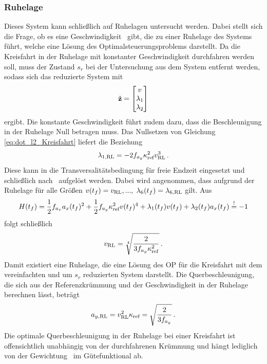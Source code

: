 \subsubsection{Ruhelage}\label{subsubsec:RL_ohne_Querdynamik}
Dieses System kann schließlich auf Ruhelagen untersucht werden. Dabei stellt sich die Frage, ob es eine Geschwindigkeit \vRL~gibt, die zu einer Ruhelage des Systems führt, welche eine Lösung des Optimalsteuerungsproblems darstellt. Da die Kreisfahrt in der Ruhelage mit konstanter Geschwindigkeit durchfahren werden soll, muss der Zustand $s_r$ bei der Untersuchung aus dem System entfernt werden, sodass sich das reduzierte System mit 
\begin{equation}
\tilde{\boldsymbol{\mathrm{z}}} = \begin{bmatrix}
v \\
\lambda_1 \\
\lambda_2
\end{bmatrix}
\end{equation}
ergibt. Die konstante Geschwindigkeit führt zudem dazu, dass die Beschleunigung in der Ruhelage Null betragen muss. Das Nullsetzen von Gleichung \eqref{eq:dot_l2_Kreisfahrt} liefert die Beziehung 
\begin{equation}
\lambda_{1,\textrm{RL}} = -2f_{a_y}\kappa_{\textrm{ref}}^2v_{\textrm{RL}}^3\,.
\end{equation}
Diese kann in die Transversalitätsbedingung für freie Endzeit eingesetzt und schließlich nach \vRL~aufgelöst werden. Dabei wird angenommen, dass aufgrund der Ruhelage für alle Größen $v(t_f) = v_{\textrm{RL}},...,$ $\lambda_6(t_f) = \lambda_{6,\textrm{RL}}$ gilt. Aus 
\begin{equation}
H(t_f) = \frac{1}{2}f_{a_x} a_x(t_f)^2 + \frac{1}{2}f_{a_y} \kappa_{\textrm{ref}}^2v(t_f)^4 + \lambda_1(t_f)v(t_f) + \lambda_2(t_f)a_x(t_f) \stackrel{!}{=} -1 
\end{equation}
folgt schließlich
\begin{equation}
v_{\textrm{RL}} = \sqrt[4]{\frac{2}{3f_{a_y}\kappa_{\textrm{ref}}^2}} \,. \label{eq:v_RL_ohne_Qerdynamik}
\end{equation}
Damit existiert eine Ruhelage, die eine Lösung des \gls{OP} für die Kreisfahrt mit dem vereinfachten und um $s_r$ reduzierten System darstellt. Die Querbeschleunigung, die sich aus der Referenzkrümmung und der Geschwindigkeit in der Ruhelage berechnen lässt, beträgt
\begin{equation}
a_{y,\textrm{RL}} = v_{\textrm{RL}}^2\kappa_{\textrm{ref}} = \sqrt{\frac{2}{3f_{a_y}}} \,. \label{eq:ayRL_Kreisfahrt}
\end{equation}
Die optimale Querbeschleunigung in der Ruhelage bei einer Kreisfahrt ist offensichtlich unabhängig von der durchfahrenen Krümmung und hängt lediglich von der Gewichtung \fay~im Gütefunktional ab.
